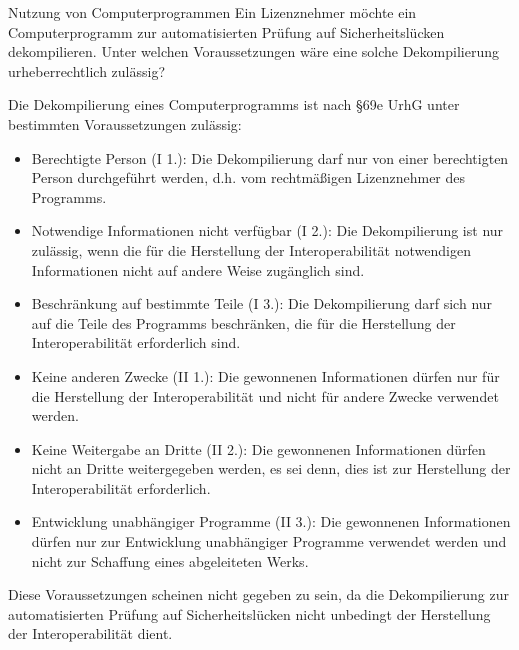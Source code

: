 \documentclass{article}
\begin{document}
\begin{exercise}{Nutzung von Computerprogrammen}
  Ein Lizenznehmer möchte ein Computerprogramm zur automatisierten Prüfung auf Sicherheitslücken dekompilieren. Unter welchen Voraussetzungen wäre eine solche Dekompilierung urheberrechtlich zulässig?

  \begin{solution}
    Die Dekompilierung eines Computerprogramms ist nach §69e UrhG unter bestimmten Voraussetzungen zulässig:
    \begin{itemize}
      \item Berechtigte Person (I 1.): Die Dekompilierung darf nur von einer berechtigten Person durchgeführt werden, d.h. vom rechtmäßigen Lizenznehmer des Programms.
      \item Notwendige Informationen nicht verfügbar (I 2.): Die Dekompilierung ist nur zulässig, wenn die für die Herstellung der Interoperabilität notwendigen Informationen nicht auf andere Weise zugänglich sind.
      \item Beschränkung auf bestimmte Teile (I 3.): Die Dekompilierung darf sich nur auf die Teile des Programms beschränken, die für die Herstellung der Interoperabilität erforderlich sind.
      \item Keine anderen Zwecke (II 1.): Die gewonnenen Informationen dürfen nur für die Herstellung der Interoperabilität und nicht für andere Zwecke verwendet werden.
      \item Keine Weitergabe an Dritte (II 2.): Die gewonnenen Informationen dürfen nicht an Dritte weitergegeben werden, es sei denn, dies ist zur Herstellung der Interoperabilität erforderlich.
      \item Entwicklung unabhängiger Programme (II 3.): Die gewonnenen Informationen dürfen nur zur Entwicklung unabhängiger Programme verwendet werden und nicht zur Schaffung eines abgeleiteten Werks.
    \end{itemize}

    Diese Voraussetzungen scheinen nicht gegeben zu sein, da die Dekompilierung zur automatisierten Prüfung auf Sicherheitslücken nicht unbedingt der Herstellung der Interoperabilität dient.
  \end{solution}
\end{exercise}
\end{document}
